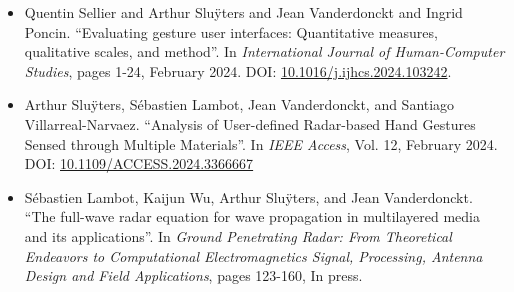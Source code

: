 {\begin{itemize}
    \item Quentin Sellier and Arthur Slu\"{y}ters and Jean Vanderdonckt and Ingrid Poncin. ``Evaluating gesture user interfaces: Quantitative measures, qualitative scales, and method''. In \textit{International Journal of Human-Computer Studies}, pages 1-24, February 2024. DOI: \href{https://doi.org/10.1016/j.ijhcs.2024.103242}{10.1016/j.ijhcs.2024.103242}. 

    \item Arthur Slu\"{y}ters, S\'{e}bastien Lambot, Jean Vanderdonckt, and Santiago Villarreal-Narvaez. ``Analysis of User-defined Radar-based Hand Gestures Sensed through Multiple Materials''. In \textit{IEEE Access}, Vol. 12, February 2024. DOI: \href{https://doi.org/10.1109/ACCESS.2024.3366667}{10.1109/ACCESS.2024.3366667}
    
    \item S\'{e}bastien Lambot, Kaijun Wu, Arthur Slu\"{y}ters, and Jean Vanderdonckt. ``The full-wave radar equation for wave propagation in multilayered media and its applications''. In \textit{Ground Penetrating Radar: From Theoretical Endeavors to Computational Electromagnetics Signal, Processing, Antenna Design and Field Applications}, pages 123-160, In press.
    
\end{itemize}
}